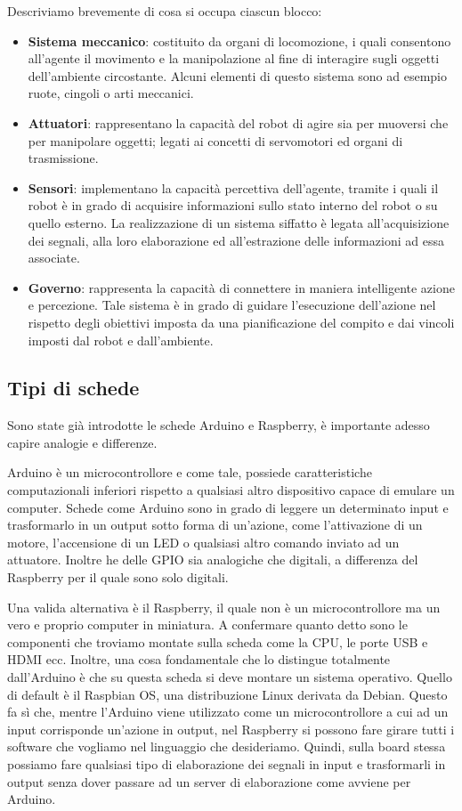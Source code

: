 \documentclass[a4paper,12pt,italian]{article}
\begin{document}
Descriviamo brevemente di cosa si occupa ciascun blocco:
\begin{itemize}
	\item \textbf{Sistema meccanico}: costituito da organi di locomozione, i quali consentono all’agente il movimento e la manipolazione al fine di interagire sugli oggetti dell’ambiente circostante. Alcuni elementi di questo sistema sono ad esempio ruote, cingoli o arti meccanici.
	\item \textbf{Attuatori}: rappresentano la capacità del robot di agire sia per muoversi che per manipolare oggetti; legati ai concetti di servomotori ed organi di trasmissione.
	\item \textbf{Sensori}: implementano la capacità percettiva dell’agente, tramite i quali il robot è in grado di acquisire informazioni sullo stato interno del robot o su quello esterno. La realizzazione di un sistema siffatto è legata all’acquisizione dei segnali, alla loro elaborazione ed all’estrazione delle informazioni ad essa associate.
	\item \textbf{Governo}: rappresenta la capacità di connettere in maniera intelligente azione e percezione. Tale sistema è in grado di guidare l’esecuzione dell’azione nel rispetto degli obiettivi imposta da una pianificazione del compito e dai vincoli imposti dal robot e dall’ambiente.
\end{itemize}

\subsection{Tipi di schede}
Sono state già introdotte le schede Arduino e Raspberry, è importante adesso capire analogie e differenze. 

Arduino è un microcontrollore e come tale, possiede caratteristiche computazionali inferiori rispetto a qualsiasi altro dispositivo capace di emulare un computer. Schede come Arduino sono in grado di leggere un determinato input e trasformarlo in un output sotto forma di un’azione, come l’attivazione di un motore, l’accensione di un LED o qualsiasi altro comando inviato ad un attuatore. Inoltre he delle GPIO sia analogiche che digitali, a differenza del Raspberry per il quale sono solo digitali. 

Una valida alternativa è il Raspberry, il quale non è un microcontrollore ma un vero e proprio computer in miniatura. A confermare quanto detto sono le componenti che troviamo montate sulla scheda come la CPU, le porte USB e HDMI ecc. Inoltre, una cosa fondamentale che lo distingue totalmente dall’Arduino è che su questa scheda si deve montare un sistema operativo. Quello di default è il Raspbian OS, una distribuzione Linux derivata da Debian. Questo fa sì che, mentre l’Arduino viene utilizzato come un microcontrollore a cui ad un input corrisponde un’azione in output, nel Raspberry si possono fare girare tutti i software che vogliamo nel linguaggio che desideriamo. Quindi, sulla board stessa possiamo fare qualsiasi tipo di elaborazione dei segnali in input e trasformarli in output senza dover passare ad un server di elaborazione come avviene per Arduino.
\end{document}
